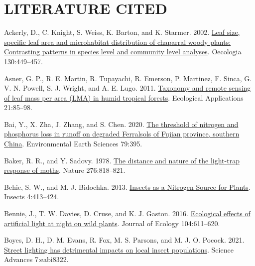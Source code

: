 \documentclass[
  12pt,
  letterpaper,
  DIV=11,
  numbers=noendperiod]{scrartcl}
\newlength{\cslhangindent}
\newlength{\cslentryspacingunit} %
\newenvironment{CSLReferences}[2] %
 {%
  \setlength{\parindent}{0pt}
  \ifodd #1
  \let\oldpar\par
  \def\par{\hangindent=\cslhangindent\oldpar}
  \fi
  \setlength{\parskip}{#2\cslentryspacingunit}
 }%
 {}
\begin{document}
\hypertarget{literature-cited}{%
\section{LITERATURE CITED}\label{literature-cited}}

\hypertarget{refs}{}
\begin{CSLReferences}{1}{0}
\leavevmode{}%
Ackerly, D., C. Knight, S. Weiss, K. Barton, and K. Starmer. 2002.
\href{https://doi.org/10.1007/s004420100805}{Leaf size, specific leaf
area and microhabitat distribution of chaparral woody plants:
Contrasting patterns in species level and community level analyses}.
Oecologia 130:449--457.

\leavevmode{}%
Asner, G. P., R. E. Martin, R. Tupayachi, R. Emerson, P. Martinez, F.
Sinca, G. V. N. Powell, S. J. Wright, and A. E. Lugo. 2011.
\href{https://doi.org/10.1890/09-1999.1}{Taxonomy and remote sensing of
leaf mass per area ({LMA}) in humid tropical forests}. Ecological
Applications 21:85--98.

\leavevmode{}%
Bai, Y., X. Zha, J. Zhang, and S. Chen. 2020.
\href{https://doi.org/10.1007/s12665-020-09130-z}{The threshold of
nitrogen and phosphorus loss in runoff on degraded {Ferralsols} of
{Fujian} province, southern {China}}. Environmental Earth Sciences
79:395.

\leavevmode{}%
Baker, R. R., and Y. Sadovy. 1978.
\href{https://doi.org/10.1038/276818a0}{The distance and nature of the
light-trap response of moths}. Nature 276:818--821.

\leavevmode{}%
Behie, S. W., and M. J. Bidochka. 2013.
\href{https://doi.org/10.3390/insects4030413}{Insects as a {Nitrogen
Source} for {Plants}}. Insects 4:413--424.

\leavevmode{}%
Bennie, J., T. W. Davies, D. Cruse, and K. J. Gaston. 2016.
\href{https://doi.org/10.1111/1365-2745.12551}{Ecological effects of
artificial light at night on wild plants}. Journal of Ecology
104:611--620.

\leavevmode{}%
Boyes, D. H., D. M. Evans, R. Fox, M. S. Parsons, and M. J. O. Pocock.
2021. \href{https://doi.org/10.1126/sciadv.abi8322}{Street lighting has
detrimental impacts on local insect populations}. Science Advances
7:eabi8322.


\end{CSLReferences}
\end{document}
